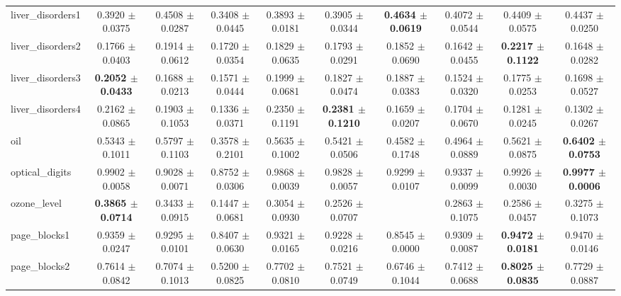 \begin{table*}[htbp]
{\begin{tabular}{lccccccccc}
            liver\_disorders1 & 0.3920 $\pm$ 0.0375 & 0.4508 $\pm$ 0.0287 & 0.3408 $\pm$ 0.0445 & 0.3893 $\pm$ 0.0181 & 0.3905 $\pm$ 0.0344 & \cellcolor{graybg}\textbf{0.4634 $\pm$ 0.0619} & 0.4072 $\pm$ 0.0544 & 0.4409 $\pm$ 0.0575 & 0.4437 $\pm$ 0.0250 \\ 
            liver\_disorders2 & 0.1766 $\pm$ 0.0403 & 0.1914 $\pm$ 0.0612 & 0.1720 $\pm$ 0.0354 & 0.1829 $\pm$ 0.0635 & 0.1793 $\pm$ 0.0291 & 0.1852 $\pm$ 0.0690 & 0.1642 $\pm$ 0.0455 & \cellcolor{graybg}\textbf{0.2217 $\pm$ 0.1122} & 0.1648 $\pm$ 0.0282 \\ 
            liver\_disorders3 & \cellcolor{graybg}\textbf{0.2052 $\pm$ 0.0433} & 0.1688 $\pm$ 0.0213 & 0.1571 $\pm$ 0.0444 & 0.1999 $\pm$ 0.0681 & 0.1827 $\pm$ 0.0474 & 0.1887 $\pm$ 0.0383 & 0.1524 $\pm$ 0.0320 & 0.1775 $\pm$ 0.0253 & 0.1698 $\pm$ 0.0527 \\ 
            liver\_disorders4 & 0.2162 $\pm$ 0.0865 & 0.1903 $\pm$ 0.1053 & 0.1336 $\pm$ 0.0371 & 0.2350 $\pm$ 0.1191 & \cellcolor{graybg}\textbf{0.2381 $\pm$ 0.1210} & 0.1659 $\pm$ 0.0207 & 0.1704 $\pm$ 0.0670 & 0.1281 $\pm$ 0.0245 & 0.1302 $\pm$ 0.0267 \\ 
            oil & 0.5343 $\pm$ 0.1011 & 0.5797 $\pm$ 0.1103 & 0.3578 $\pm$ 0.2101 & 0.5635 $\pm$ 0.1002 & 0.5421 $\pm$ 0.0506 & 0.4582 $\pm$ 0.1748 & 0.4964 $\pm$ 0.0889 & 0.5621 $\pm$ 0.0875 & \cellcolor{graybg}\textbf{0.6402 $\pm$ 0.0753} \\ 
            optical\_digits & 0.9902 $\pm$ 0.0058 & 0.9028 $\pm$ 0.0071 & 0.8752 $\pm$ 0.0306 & 0.9868 $\pm$ 0.0039 & 0.9828 $\pm$ 0.0057 & 0.9299 $\pm$ 0.0107 & 0.9337 $\pm$ 0.0099 & 0.9926 $\pm$ 0.0030 & \cellcolor{graybg}\textbf{0.9977 $\pm$ 0.0006} \\ 
            ozone\_level & \cellcolor{graybg}\textbf{0.3865 $\pm$ 0.0714} & 0.3433 $\pm$ 0.0915 & 0.1447 $\pm$ 0.0681 & 0.3054 $\pm$ 0.0930 & 0.2526 $\pm$ 0.0707 &  & 0.2863 $\pm$ 0.1075 & 0.2586 $\pm$ 0.0457 & 0.3275 $\pm$ 0.1073 \\ 
            page\_blocks1 & 0.9359 $\pm$ 0.0247 & 0.9295 $\pm$ 0.0101 & 0.8407 $\pm$ 0.0630 & 0.9321 $\pm$ 0.0165 & 0.9228 $\pm$ 0.0216 & 0.8545 $\pm$ 0.0000 & 0.9309 $\pm$ 0.0087 & \cellcolor{graybg}\textbf{0.9472 $\pm$ 0.0181} & 0.9470 $\pm$ 0.0146 \\ 
            page\_blocks2 & 0.7614 $\pm$ 0.0842 & 0.7074 $\pm$ 0.1013 & 0.5200 $\pm$ 0.0825 & 0.7702 $\pm$ 0.0810 & 0.7521 $\pm$ 0.0749 & 0.6746 $\pm$ 0.1044 & 0.7412 $\pm$ 0.0688 & \cellcolor{graybg}\textbf{0.8025 $\pm$ 0.0835} & 0.7729 $\pm$ 0.0887 \\ 

\end{tabular}}
\end{table*}
